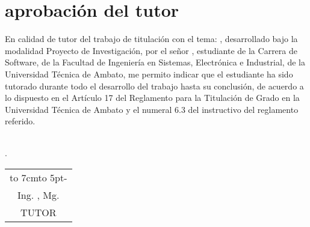 \chapter*{aprobación del tutor}

En calidad de tutor del trabajo de titulación con el tema:
{\MakeUppercase\tema},
desarrollado bajo
la modalidad Proyecto de Investigación, por el señor \autor,
estudiante de la Carrera de Software, de la Facultad de Ingeniería en Sistemas, Electrónica e Industrial, de la
Universidad Técnica de Ambato, me permito indicar que el estudiante ha sido tutorado
durante todo el desarrollo del trabajo hasta su conclusión, de acuerdo a lo dispuesto en
el Artículo 17 del Reglamento para la Titulación de Grado en la Universidad Técnica
de Ambato y el numeral 6.3 del instructivo del reglamento referido.
\\
\\
\begin{flushright}
	\lugarFechaPrelims.
\end{flushright}

\vspace*{5cm}
\begin{center}
	\begin{tabular}{c}
		\hbox to 7cm{\leaders\hbox to 5pt{\hss - \hss}\hfil} \\
		Ing. \tutor, Mg.\\
		TUTOR
	\end{tabular}
\end{center}
